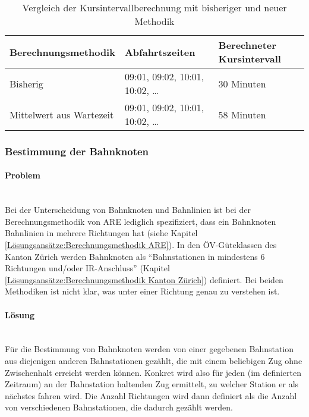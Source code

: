 \begin{table}[ht]
    \centering
    \begin{tabular}[c]{l l l}
        \toprule
        \textbf{Berechnungsmethodik}
                                    & \textbf{Abfahrtszeiten}
                                    & \textbf{Berechneter Kursintervall}\\
        \midrule
        Bisherig
                                    & 09:01, 09:02, 10:01, 10:02, \dots
                                    & 30 Minuten\\
        Mittelwert aus Wartezeit    & 09:01, 09:02, 10:01, 10:02, \dots
                                    & 58 Minuten\\
        \bottomrule
    \end{tabular}
    \caption{Vergleich der Kursintervallberechnung mit bisheriger und neuer Methodik}
    \label{table:Vergleich der Kursintervallberechnung mit bisheriger und neuer Methodik}
\end{table}

\subsubsection{Bestimmung der Bahnknoten}
\label{Verbesserungsmöglichkeiten:Bestimmung der Bahnknoten}

\paragraph{Problem}~\\
Bei der Unterscheidung von Bahnknoten und Bahnlinien ist bei der Berechnungsmethodik von ARE lediglich spezifiziert, dass ein Bahnknoten Bahnlinien in mehrere Richtungen hat (siehe Kapitel \ref{Lösungsansätze:Berechnungsmethodik ARE}).
In den ÖV-Güteklassen des Kanton Zürich werden Bahnknoten als "`Bahnstationen in mindestens 6 Richtungen und/oder IR-Anschluss"' (Kapitel \ref{Lösungsansätze:Berechnungsmethodik Kanton Zürich}) definiert.
Bei beiden Methodiken ist nicht klar, was unter einer Richtung genau zu verstehen ist.

\paragraph{Lösung}~\\
Für die Bestimmung von Bahnknoten werden von einer gegebenen Bahnstation aus diejenigen anderen Bahnstationen gezählt, die mit einem beliebigen Zug ohne Zwischenhalt erreicht werden können.
Konkret wird also für jeden (im definierten Zeitraum) an der Bahnstation haltenden Zug ermittelt, zu welcher Station er als nächstes fahren wird.
Die Anzahl Richtungen wird dann definiert als die Anzahl von verschiedenen Bahnstationen, die dadurch gezählt werden.
